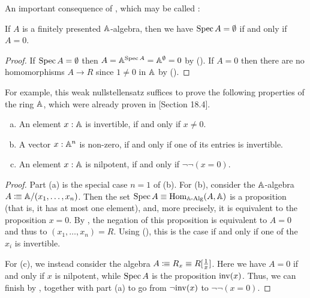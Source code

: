An important consequence of , which may be called :

\begin{proposition}%
  \label{weak-nullstellensatz}
  If $A$ is a finitely presented $\mathbb{A}$-algebra,
  then we have $\operatorname{Spec} A=\emptyset$ if and only if $A=0$.
\end{proposition}

\begin{proof}
  If $\operatorname{Spec} A = \emptyset$
  then $A = \mathbb{A}^{\operatorname{Spec} A} = \mathbb{A}^\emptyset = 0$
  by ().
  If $A = 0$
  then there are no homomorphisms $A \to R$
  since $1 \neq 0$ in $\mathbb{A}$ by ().
\end{proof}

For example, this weak nullstellensatz suffices
to prove the following properties of the ring $\mathbb{A}$,
which were already proven in
\cite{ingo-thesis}[Section 18.4].

\begin{proposition}%
  \label{nilpotence-double-negation}\label{non-zero-invertible}\label{generalized-field-property}
  
  \begin{enumerate}[(a)]
  \item An element $x:\mathbb{A}$ is invertible,
    if and only if $x\neq 0$.
  \item A vector $x:\mathbb{A}^n$ is non-zero,
    if and only if one of its entries is invertible.
  \item An element $x:\mathbb{A}$ is nilpotent,
    if and only if $\neg \neg (x=0)$.
  \end{enumerate}
\end{proposition}

\begin{proof}
  Part (a) is the special case $n = 1$ of (b).
  For (b),
  consider the $\mathbb{A}$-algebra $A \vcentcolon\mspace{-1.2mu}\equiv \mathbb{A}/(x_1, \dots, x_n)$.
  Then the set $\operatorname{Spec} A \equiv \mathrm{Hom}_{\mathbb{A}\text{-}\mathrm{Alg}}(A, \mathbb{A})$
  is a proposition (that is, it has at most one element),
  and, more precisely, it is equivalent to the proposition $x = 0$.
  By ,
  the negation of this proposition is equivalent to $A = 0$
  and thus to $(x_1, \dots, x_n) = R$.
  Using (),
  this is the case if and only if one of the $x_i$ is invertible.

  For (c),
  we instead consider the algebra $A \vcentcolon\mspace{-1.2mu}\equiv R_x \equiv R[\frac{1}{x}]$.
  Here we have $A = 0$ if and only if $x$ is nilpotent,
  while $\operatorname{Spec} A$ is the proposition $\mathrm{inv}(x)$.
  Thus, we can finish by ,
  together with part (a) to go from $\lnot \mathrm{inv}(x)$ to $\lnot \lnot (x = 0)$.
\end{proof}

